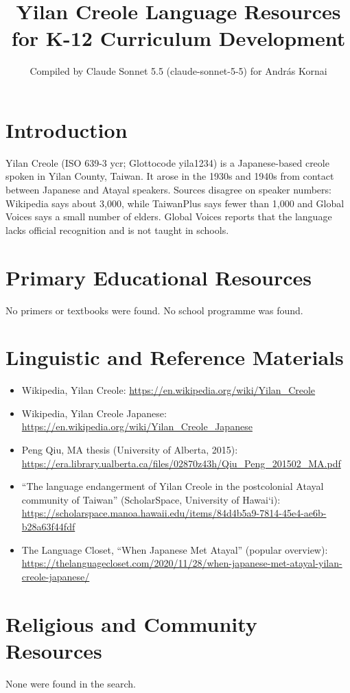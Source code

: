 \documentclass[12pt]{article}
\title{Yilan Creole Language Resources for K-12 Curriculum Development}
\author{Compiled by Claude Sonnet 5.5 (claude-sonnet-5-5) for Andr\'as Kornai}
\date{}
\begin{document}
\maketitle

\section{Introduction}
Yilan Creole (ISO 639-3 ycr; Glottocode yila1234) is a Japanese-based creole spoken in Yilan County, Taiwan. It arose in the 1930s and 1940s from contact between Japanese and Atayal speakers. Sources disagree on speaker numbers: Wikipedia says about 3,000, while TaiwanPlus says fewer than 1,000 and Global Voices says a small number of elders. Global Voices reports that the language lacks official recognition and is not taught in schools.

\section{Primary Educational Resources}
No primers or textbooks were found. No school programme was found.

\section{Linguistic and Reference Materials}
\begin{itemize}
\item Wikipedia, Yilan Creole: \url{https://en.wikipedia.org/wiki/Yilan_Creole}
\item Wikipedia, Yilan Creole Japanese: \url{https://en.wikipedia.org/wiki/Yilan_Creole_Japanese}
\item Peng Qiu, MA thesis (University of Alberta, 2015): \url{https://era.library.ualberta.ca/files/02870z43h/Qiu_Peng_201502_MA.pdf}
\item ``The language endangerment of Yilan Creole in the postcolonial Atayal community of Taiwan'' (ScholarSpace, University of Hawai\textquoteleft i): \url{https://scholarspace.manoa.hawaii.edu/items/84d4b5a9-7814-45e4-ae6b-b28a63f44fdf}
\item The Language Closet, ``When Japanese Met Atayal'' (popular overview): \url{https://thelanguagecloset.com/2020/11/28/when-japanese-met-atayal-yilan-creole-japanese/}
\end{itemize}

\section{Religious and Community Resources}
None were found in the search.
\end{document}

